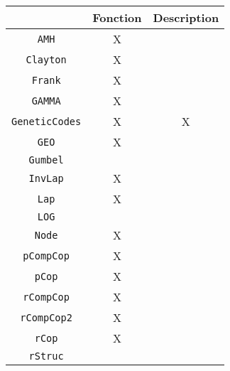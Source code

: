 \documentclass[11pt, french]{article}
\begin{document}
\begin{figure}[H]
  \centering
  \begin{tabular}{||c|c|c||}
  \hline
  {} & \textbf{Fonction} & \textbf{Description} \\
  \hline
  \texttt{AMH} & X &\\
  \hline
  \texttt{Clayton} & X &  \\
  \hline
  \texttt{Frank} & X &  \\
  \hline
  \texttt{GAMMA} & X & \\
  \hline
  \texttt{GeneticCodes} & X & X \\
  \hline
  \texttt{GEO} & X & \\
  \hline
  \texttt{Gumbel} & & \\
  \hline
  \texttt{InvLap} & X & \\
  \hline
  \texttt{Lap} & X & \\
  \hline
  \texttt{LOG} &  & \\
  \hline
  \texttt{Node} & X & \\
  \hline
  \texttt{pCompCop} & X & \\
  \hline
  \texttt{pCop} & X & \\
  \hline
  \texttt{rCompCop} & X & \\
  \hline
  \texttt{rCompCop2} & X & \\
  \hline
  \texttt{rCop} & X & \\
  \hline
  \texttt{rStruc} & & \\
  \hline
  \end{tabular}
\end{figure}
\end{document}

